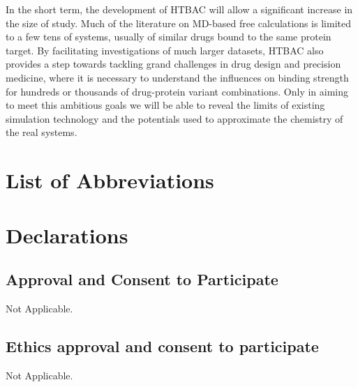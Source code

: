\documentclass{bmcart}
\begin{document}
In the short term, the development of HTBAC will allow a significant increase
in the size of study. Much of the literature on MD-based free  
calculations is limited to a few tens of systems, usually of similar drugs
bound to the same protein target. By facilitating investigations of much
larger datasets, HTBAC also provides a step towards tackling grand challenges
in drug design and precision medicine, where it is necessary to understand 
the influences on binding strength for hundreds or thousands of drug-protein
variant combinations. Only in aiming to meet this ambitious goals we will be
able to reveal the limits of existing simulation technology and the
potentials used to approximate the chemistry of the real systems.










\section*{List of Abbreviations}\label{sec:abbreviations}

\acuseall

\printacronyms[include-classes=abbrev, name=Abbreviations, heading=none]

\section*{Declarations}

\subsection*{Approval and Consent to Participate}
Not Applicable. 

\subsection*{Ethics approval and consent to participate}
Not Applicable. 

\end{document}
